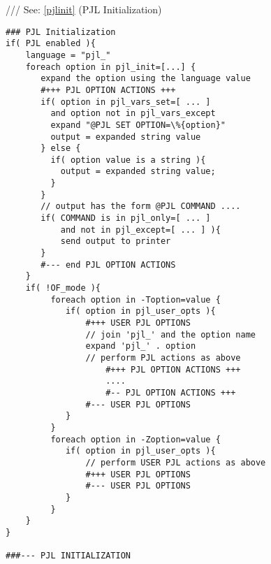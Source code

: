 \documentclass[a4paper]{article}
\begin{document}
{\ttfamily ///} See: \ref{pjlinit} {(PJL Initialization)}
\begin{tscreen}
\begin{verbatim}
### PJL Initialization
if( PJL enabled ){
    language = "pjl_"
    foreach option in pjl_init=[...] {
       expand the option using the language value
       #+++ PJL OPTION ACTIONS +++
       if( option in pjl_vars_set=[ ... ]
         and option not in pjl_vars_except
         expand "@PJL SET OPTION=\%{option}"
         output = expanded string value
       } else {
         if( option value is a string ){
           output = expanded string value;
         }
       }
       // output has the form @PJL COMMAND ....
       if( COMMAND is in pjl_only=[ ... ]
           and not in pjl_except=[ ... ] ){
           send output to printer
       }
       #--- end PJL OPTION ACTIONS
    }
    if( !OF_mode ){
         foreach option in -Toption=value {
            if( option in pjl_user_opts ){
                #+++ USER PJL OPTIONS
                // join 'pjl_' and the option name
                expand 'pjl_' . option
                // perform PJL actions as above
                    #+++ PJL OPTION ACTIONS +++
                    ....
                    #-- PJL OPTION ACTIONS +++
                #--- USER PJL OPTIONS
            }
         }
         foreach option in -Zoption=value {
            if( option in pjl_user_opts ){
                // perform USER PJL actions as above
                #+++ USER PJL OPTIONS
                #--- USER PJL OPTIONS
            }
         }
    }
}

###--- PJL INITIALIZATION
\end{verbatim}
\end{tscreen}
\end{document}
